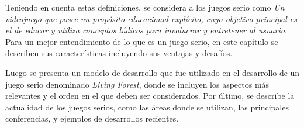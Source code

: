 Teniendo en cuenta estas definiciones, se considera a los juegos serio como 
\emph{Un videojuego que posee un propósito educacional explícito, cuyo objetivo 
principal es el de educar y utiliza conceptos lúdicos para involucrar y entretener 
al usuario}. Para un mejor entendimiento de lo que es un juego serio, en este 
capítulo se describen sus características incluyendo sus ventajas y desafíos.

Luego se presenta un modelo de desarrollo que fue utilizado en el desarrollo de
un juego serio denominado \textit{Living Forest}, donde se incluyen los aspectos
más relevantes y el orden en el que deben ser considerados. Por último, se describe 
la actualidad de los juegos serios, como las áreas donde
se utilizan, las principales conferencias, y ejemplos de desarrollos recientes. 








